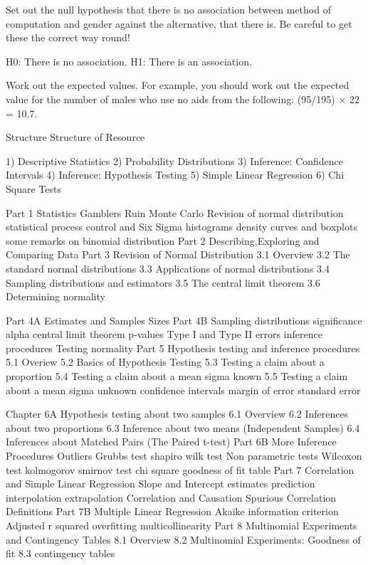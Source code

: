 \documentclass[]{report}
\begin{document}
Set out the null hypothesis that there is no association between method of computation
and gender against the alternative, that there is. Be careful to get these the correct way
round!

H0: There is no association.
H1: There is an association.

Work out the expected values. For example, you should work out the expected value for
the number of males who use no aids from the following: (95/195) × 22 = 10.7.


\newpage
Structure
Structure of Resource

1) Descriptive Statistics
2) Probability Distributions
3) Inference: Confidence Intervals
4) Inference: Hypothesis Testing
5) Simple Linear Regression
6) Chi Square Tests

Part 1 Statistics 
Gamblers Ruin Monte Carlo 
Revision of normal distribution
statistical process control and Six Sigma
histograms density curves and boxplots
some remarks on binomial distribution
Part 2 Describing,Exploring and Comparing Data
Part 3 Revision of Normal Distribution
3.1 Overview
3.2 The standard normal distributions
3.3 Applications of normal distributions
3.4 Sampling distributions and estimators
3.5 The central limit theorem
3.6 Determining normality

Part 4A Estimates and Samples Sizes
Part 4B Sampling distributions
significance alpha
central limit theorem
p-values Type I and Type II errors
inference procedures
Testing normality
Part 5 Hypothesis testing and inference procedures
5.1 Overiew
5.2 Basics of Hypothesis Testing
5.3 Testing a claim about a proportion
5.4 Testing a claim about a mean sigma known
5.5 Testing a claim about a mean sigma unknown
confidence intervals margin of error standard error

Chapter 6A Hypothesis testing about two samples
6.1 Overview
6.2 Inferences about two proportions
6.3 Inference about two means (Independent Samples)
6.4 Inferences about Matched Pairs (The Paired t-test)
Part 6B More Inference Procedures
Outliers Grubbs test
shapiro wilk test
Non parametric tests 
Wilcoxon test
kolmogorov smirnov test
chi square goodness of fit table
Part 7 Correlation and Simple Linear Regression
Slope and Intercept estimates
prediction
interpolation extrapolation
Correlation and Causation
Spurious Correlation 
Definitions 
Part 7B Multiple Linear Regression
Akaike information criterion
Adjusted r squared
overfitting 
multicollinearity
Part 8 Multinomial Experiments and Contingency Tables
8.1 Overview
8.2 Multinomial Experiments: Goodness of fit
8.3 contingency tables
\end{document}
